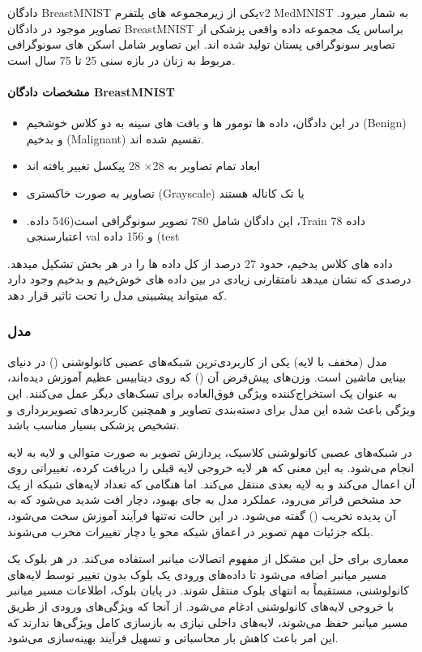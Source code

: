 \documentclass{article}
\begin{document}
دادگان BreastMNIST یکی از زیرمجموعه های پلتفرمv2 MedMNIST  به شمار میرود. تصاویر موجود در دادگان BreastMNIST براساس یک مجموعه داده واقعی پزشکی از تصاویر سونوگرافی پستان تولید شده اند. این تصاویر شامل اسکن های سونوگرافی مربوط به زنان در بازه سنی 25 تا 75 سال است.
\paragraph{مشخصات دادگان BreastMNIST} \label{properties}
\begin{itemize}
	\item در این دادگان، داده ها تومور ها و بافت های سینه به دو کلاس خوشخیم (Benign) و بدخیم (Malignant) تقسیم شده اند.
	\item ابعاد تمام تصاویر به 28$\times$ 28 پیکسل تغییر یافته اند
	\item تصاویر به صورت خاکستری (Grayscale) یا تک کاناله هستند
	\item .این دادگان شامل 780 تصویر سونوگرافی است(546 داده ،Train 78 داده اعتبارسنجی val و 156 داده (test
\end{itemize}
داده های کلاس بدخیم، حدود 27 درصد از کل داده ها را در هر بخش تشکیل میدهد. درصدی که نشان میدهد نامتقارنی زیادی در بین داده های خوش‌خیم و بدخیم وجود دارد که میتواند پیشبینی مدل را تحت تاثیر قرار دهد.
\subsubsection{مدل \, } \label{resnet18}

مدل  (مخفف  با  لایه) یکی از کاربردی‌ترین شبکه‌های عصبی کانولوشنی () در دنیای بینایی ماشین است. وزن‌های پیش‌فرض آن () که روی دیتابیس عظیم  آموزش دیده‌اند، به عنوان یک استخراج‌کننده ویژگی فوق‌العاده برای تسک‌های دیگر عمل می‌کنند. این ویژگی باعث شده این مدل برای دسته‌بندی تصاویر و همچنین کاربردهای تصویربرداری و تشخیص پزشکی بسیار مناسب باشد.

در شبکه‌های عصبی کانولوشنی کلاسیک، پردازش تصویر به صورت متوالی و لایه به لایه انجام می‌شود. به این معنی که هر لایه خروجی لایه قبلی را دریافت کرده، تغییراتی روی آن اعمال می‌کند و به لایه بعدی منتقل می‌کند. اما هنگامی که تعداد لایه‌های شبکه از یک حد مشخص فراتر می‌رود، عملکرد مدل به جای بهبود، دچار افت شدید می‌شود که به آن پدیده تخریب () گفته می‌شود. در این حالت نه‌تنها فرآیند آموزش سخت می‌شود، بلکه جزئیات مهم تصویر در اعماق شبکه محو یا دچار تغییرات مخرب می‌شوند.

معماری  برای حل این مشکل از مفهوم اتصالات میانبر استفاده می‌کند. \label{mianbor} در هر بلوک  یک مسیر میانبر اضافه می‌شود تا داده‌های ورودی یک بلوک بدون تغییر توسط لایه‌های کانولوشنی، مستقیماً به انتهای بلوک منتقل شوند. در پایان بلوک، اطلاعات مسیر میانبر با خروجی لایه‌های کانولوشنی ادغام می‌شود. از آنجا که ویژگی‌های ورودی از طریق مسیر میانبر حفظ می‌شوند، لایه‌های داخلی نیازی به بازسازی کامل ویژگی‌ها ندارند که این امر باعث کاهش بار محاسباتی و تسهیل فرآیند بهینه‌سازی می‌شود.
\end{document}
